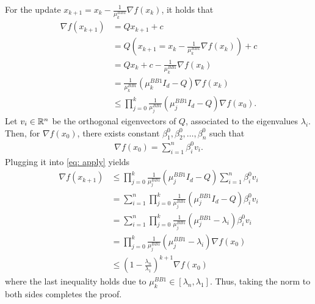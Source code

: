 \documentclass{ExerciseSheet}
\begin{document}
\begin{solution}
    For the update $x_{k+1}=x_k-\frac{1}{\mu_k^{BB1}} \nabla f(x_k)$, it holds that
    \begin{align}
        \nabla f(x_{k+1}) &= Q x_{k+1}+c \nonumber \\
        & = Q\left(x_{k+1}=x_k-\frac{1}{\mu_k^{BB1}} \nabla f(x_k)\right)+c \nonumber\\
        & = Q x_k +c - \frac{1}{\mu_k^{BB1}} \nabla f(x_k)\nonumber\\
        & = \frac{1}{\mu_k^{BB1}}\left( \mu_k^{BB1}I_d - Q \right)\nabla f(x_k)\nonumber\\
        & \leq \prod_{j=0}^k \frac{1}{\mu_j^{BB1}}\left( \mu_j^{BB1}I_d - Q \right)\nabla f(x_0)\label{eq: apply} .
    \end{align}
    Let $v_i\in\mathbb{R}^n$ be the orthogonal eigenvectors of $Q$, associated to the eigenvalues $\lambda_i$. Then, for $\nabla f(x_0)$, there exists constant $\beta_1^0, \beta_2^0,\ldots,\beta_n^0$ such that
    \begin{align*}
        \nabla f(x_0) = \sum_{i=1}^n \beta_i^0 v_i.
    \end{align*}
    Plugging it into \eqref{eq: apply} yields
    \begin{align*}
        \nabla f(x_{k+1})&\leq \prod_{j=0}^k \frac{1}{\mu_j^{BB1}}\left( \mu_j^{BB1}I_d - Q \right)\sum_{i=1}^n \beta_i^0 v_i\\
        & = \sum_{i=1}^n\prod_{j=0}^k \frac{1}{\mu_j^{BB1}}\left( \mu_j^{BB1}I_d - Q \right)\beta_i^0 v_i\\
        & = \sum_{i=1}^n\prod_{j=0}^k \frac{1}{\mu_j^{BB1}}\left( \mu_j^{BB1} - \lambda_i \right)\beta_i^0 v_i\\
        & = \prod_{j=0}^k \frac{1}{\mu_j^{BB1}}\left( \mu_j^{BB1} - \lambda_i \right)\nabla f(x_0)\\
        & \leq \left( 1- \frac{\lambda_n}{\lambda_1}\right)^{k+1}\nabla f(x_0)
    \end{align*}
    where the last inequality holds due to $\mu_k^{BB1} \in [\lambda_n, \lambda_1]$. Thus, taking the norm to both sides completes the proof.
\end{solution}

\fi

\end{document}
